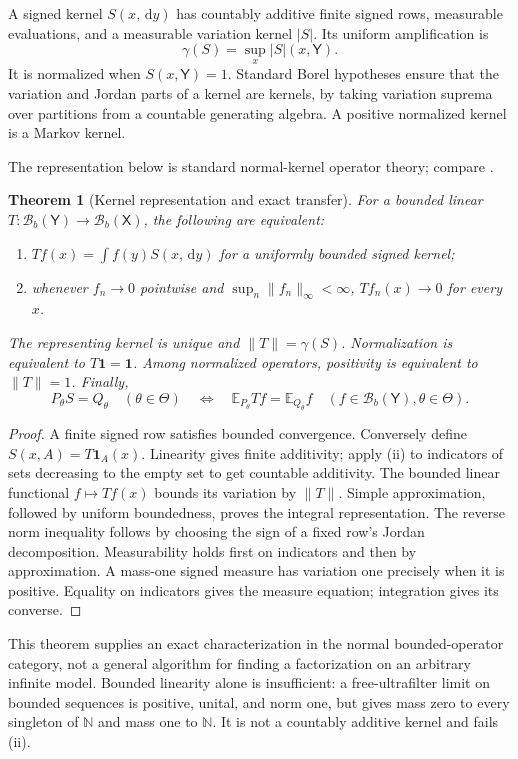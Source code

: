 \documentclass[11pt]{article}
\numberwithin{equation}{section}
\newtheorem{theorem}{Theorem}[section]
\theoremstyle{definition}
\theoremstyle{remark}
\newcommand{\E}{\mathbb E}\newcommand{\Pp}{\mathbb P}\newcommand{\R}{\mathbb R}\newcommand{\N}{\mathbb N}
\newcommand{\ind}{\mathbf1}\newcommand{\Prob}{\mathcal P}\newcommand{\Ee}{\mathcal E}\newcommand{\Ff}{\mathcal F}
\newcommand{\Bb}{\mathcal B_b}\newcommand{\TV}{d_{\rm TV}}\newcommand{\Var}{\operatorname{Var}}\newcommand{\Pois}{\operatorname{Pois}}
\newcommand{\dd}{\,\mathrm d}\newcommand{\norm}[1]{\left\lVert#1\right\rVert}\newcommand{\Scal}{\mathsf S}\newcommand{\Tcal}{\mathsf T}
\begin{document}
A signed kernel $S(x,\dd y)$ has countably additive finite signed rows, measurable evaluations, and a measurable variation kernel $|S|$. Its uniform amplification is
\[
 \gamma(S)=\sup_x|S|(x,\mathsf Y).
\]
It is normalized when $S(x,\mathsf Y)=1$. Standard Borel hypotheses ensure that the variation and Jordan parts of a kernel are kernels, by taking variation suprema over partitions from a countable generating algebra. A positive normalized kernel is a Markov kernel.

The representation below is standard normal-kernel operator theory;
compare \cite[Section 2]{KuhnKunze2022}.
\begin{theorem}[Kernel representation and exact transfer]\label{thm:normal}
For a bounded linear $T:\Bb(\mathsf Y)\to\Bb(\mathsf X)$, the following are equivalent:
\begin{enumerate}[label=(\roman*)]
\item $T f(x)=\int f(y)S(x,\dd y)$ for a uniformly bounded signed kernel;
\item whenever $f_n\to0$ pointwise and $\sup_n\|f_n\|_\infty<\infty$, $Tf_n(x)\to0$ for every $x$.
\end{enumerate}
The representing kernel is unique and $\|T\|=\gamma(S)$. Normalization is equivalent to $T\ind=\ind$. Among normalized operators, positivity is equivalent to $\|T\|=1$. Finally,
\begin{equation}\label{eq:intertwine}
 P_\theta S=Q_\theta\quad(\theta\in\Theta)
 \quad\Longleftrightarrow\quad
 \E_{P_\theta}Tf=\E_{Q_\theta}f\quad(f\in\Bb(\mathsf Y),\theta\in\Theta).
\end{equation}
\end{theorem}
\begin{proof}
A finite signed row satisfies bounded convergence. Conversely define $S(x,A)=T\ind_A(x)$. Linearity gives finite additivity; apply (ii) to indicators of sets decreasing to the empty set to get countable additivity. The bounded linear functional $f\mapsto Tf(x)$ bounds its variation by $\|T\|$. Simple approximation, followed by uniform boundedness, proves the integral representation. The reverse norm inequality follows by choosing the sign of a fixed row's Jordan decomposition. Measurability holds first on indicators and then by approximation. A mass-one signed measure has variation one precisely when it is positive. Equality on indicators gives the measure equation; integration gives its converse.
\end{proof}
This theorem supplies an exact characterization in the normal bounded-operator category, not a general algorithm for finding a factorization on an arbitrary infinite model. Bounded linearity alone is insufficient: a free-ultrafilter limit on bounded sequences is positive, unital, and norm one, but gives mass zero to every singleton of $\N$ and mass one to $\N$. It is not a countably additive kernel and fails (ii).
\end{document}
